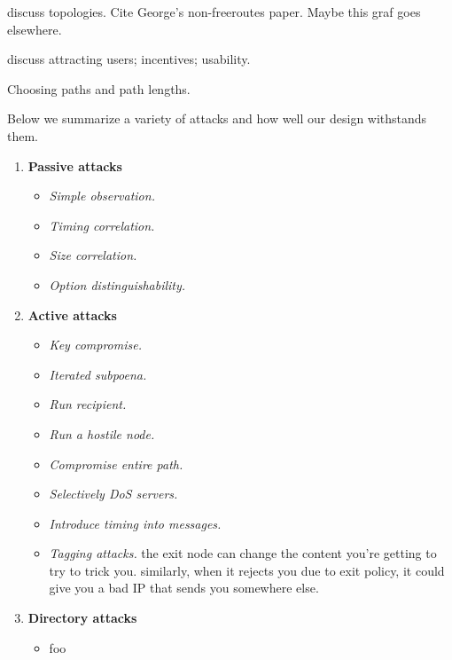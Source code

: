 \documentclass[times,10pt,twocolumn]{article}
\begin{document}
discuss topologies. Cite George's non-freeroutes paper.  Maybe this
graf goes elsewhere.

discuss attracting users; incentives; usability.

Choosing paths and path lengths.


\label{sec:attacks}

Below we summarize a variety of attacks and how well our design withstands
them.

\begin{enumerate}
\item \textbf{Passive attacks}
\begin{itemize}
\item \emph{Simple observation.}
\item \emph{Timing correlation.}
\item \emph{Size correlation.}
\item \emph{Option distinguishability.}
\end{itemize}

\item \textbf{Active attacks}
\begin{itemize}
\item \emph{Key compromise.}
\item \emph{Iterated subpoena.}
\item \emph{Run recipient.}
\item \emph{Run a hostile node.}
\item \emph{Compromise entire path.}
\item \emph{Selectively DoS servers.}
\item \emph{Introduce timing into messages.}
\item \emph{Tagging attacks.}
the exit node can change the content you're getting to try to
trick you. similarly, when it rejects you due to exit policy,
it could give you a bad IP that sends you somewhere else.
\end{itemize}

\item \textbf{Directory attacks}
\begin{itemize}
\item foo
\end{itemize}

\end{enumerate}

\end{document}
